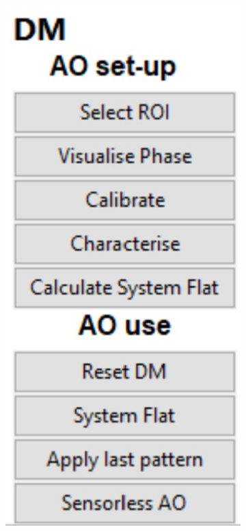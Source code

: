 \begin{figure}[H]
	\centering
	\begin{subfigure}{0.25\textwidth}
		\centering
		\includegraphics[width=\linewidth]{images/DM_methods_cockpit.jpg}

\end{subfigure}
\end{figure}
